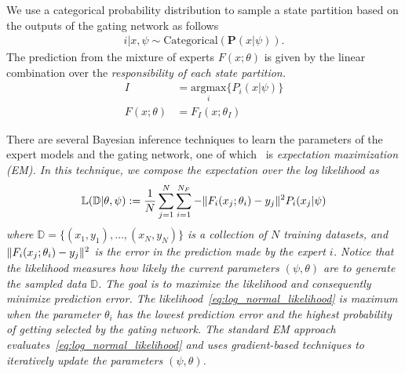 We use a categorical probability distribution to sample a state partition based
on the outputs of the gating network as follows~\cite{harkonen2022mixtures} 
\begin{align}
  i | x, \psi \sim \text{Categorical}(\mathbf{P}(x| \psi)). 
  \label{eq:gating_categorical}
\end{align}
%
The prediction from the mixture of experts $F(x; \theta)$ is given by the linear
combination over the \it{responsibility} \normalfont of each state partition.
%
\begin{align*}
  I &= \underset{i}{\textrm{argmax}} \{ P_i(x | \psi) \}\\
  F(x; \theta) &= F_I(x; \theta_I)
\end{align*}



There are several Bayesian inference techniques to learn the parameters of the
expert models and the gating network, one of which~ is \it{expectation
maximization} \normalfont (EM).
%
In this technique, we compose the expectation over the log likelihood
as~\cite{bishop2006pattern}   
\begin{equation}
  \mathbb{L}(\mathbb{D} | \theta, \psi) := \frac{1}{N} \sum_{j=1}^{N} \sum_{i=1}^{N_F} -\|{F_i(x_j; \theta_i) - y_j}\|_{{}_{}}^2 P_i(x_j | \psi) 
  \label{eq:log_normal_likelihood}
\end{equation}
\noindent where $\mathbb{D} = \{(x_1, y_1), \dots, (x_N, y_N)\}$ is a collection
of $N$ training datasets, and $\|{F_i(x_j; \theta_i) - y_j}\|_{{}_{}}^2$ is the error in the
prediction made by the expert $i$.
%
Notice that the likelihood measures how likely the current parameters $(\psi,
\theta)$ are to generate the sampled data $\mathbb{D}$. 
%
The goal is to maximize the likelihood and consequently minimize prediction
error.
%
The likelihood~\eqref{eq:log_normal_likelihood} is maximum when the parameter $\theta_i$
has the lowest prediction error and the highest probability of getting selected
by the gating network.
%
The standard EM approach evaluates~\eqref{eq:log_normal_likelihood} and uses
gradient-based techniques to iteratively update the parameters $(\psi, \theta)$.
%
